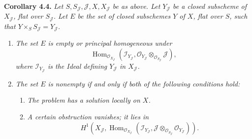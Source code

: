 \medskip
\noindent{}\textbf{Corollary 4.4.}
\textit{Let \(S,S_{\mathscr J},\mathscr J,X,X_{\mathscr J}\) be as above. Let
\(Y_{\mathscr J}\) be a closed subscheme of \(X_{\mathscr J}\), flat over
\(S_{\mathscr J}\). Let \(E\) be the set of closed subschemes \(Y\) of \(X\),
flat over \(S\), such that \(Y\times_S S_{\mathscr J}=Y_{\mathscr J}\).}
\begin{enumerate}
\item[(i)] \textit{The set \(E\) is empty or principal homogeneous under}
\[
 \operatorname{Hom}_{\mathscr O_{X_{\mathscr J}}}
 \left(
  \mathscr I_{Y_{\mathscr J}},
  \mathscr O_{Y_{\mathscr J}}\otimes_{\mathscr O_{S_{\mathscr J}}}\mathscr J
 \right),
\]
\textit{where \(\mathscr I_{Y_{\mathscr J}}\) is the Ideal defining
\(Y_{\mathscr J}\) in \(X_{\mathscr J}\).}

\item[(ii)] \textit{The set \(E\) is nonempty if and only if both of the
following conditions hold:}
\begin{enumerate}
\item[(a)] \textit{The problem has a solution locally on \(X\).}
\item[(b)] \textit{A certain obstruction vanishes; it lies in}
\[
 H^1\!\left(
  X_{\mathscr J},
  \operatorname{Hom}_{\mathscr O_{X_{\mathscr J}}}
  \left(
   \mathscr I_{Y_{\mathscr J}},
   \mathscr J\otimes_{\mathscr O_{S_{\mathscr J}}}
   \mathscr O_{Y_{\mathscr J}}
  \right)
 \right).
\]
\end{enumerate}
\end{enumerate}


